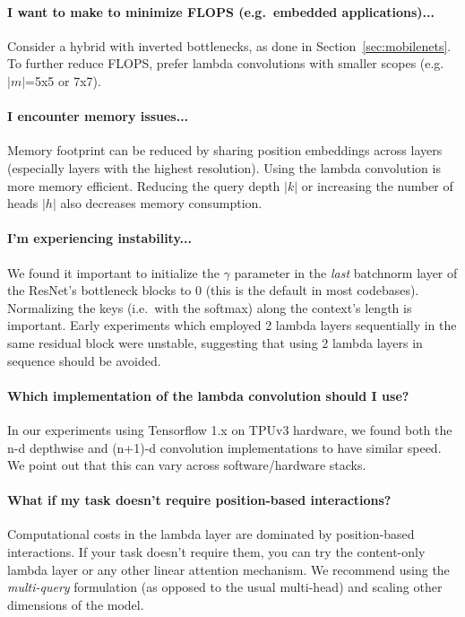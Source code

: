 \documentclass{article} \usepackage{iclr2021_conference,times}
\begin{document}
\paragraph{I want to make to minimize FLOPS (e.g.\ embedded applications)...}
Consider a hybrid with inverted bottlenecks, as done in Section~\ref{sec:mobilenets}.
To further reduce FLOPS, prefer lambda convolutions with smaller scopes (e.g. $|m|$=5x5 or 7x7).

\paragraph{I encounter memory issues...}
Memory footprint can be reduced by sharing position embeddings across layers (especially layers with the highest resolution).
Using the lambda convolution is more memory efficient.
Reducing the query depth $|k|$ or increasing the number of heads $|h|$ also decreases memory consumption.

\paragraph{I'm experiencing instability...}
We found it important to initialize the $\gamma$ parameter in the \emph{last} batchnorm layer of the ResNet's bottleneck blocks to 0 (this is the default in most codebases).
Normalizing the keys (i.e.\ with the softmax) along the context's length is important. 
Early experiments which employed 2 lambda layers sequentially in the same residual block were unstable, suggesting that using 2 lambda layers in sequence should be avoided.

\paragraph{Which implementation of the lambda convolution should I use?}
In our experiments using Tensorflow 1.x on TPUv3 hardware, we found both the n-d depthwise and (n+1)-d convolution implementations to have similar speed.
We point out that this can vary across software/hardware stacks.

\paragraph{What if my task doesn't require position-based interactions?}
Computational costs in the lambda layer are dominated by position-based interactions.
If your task doesn't require them, you can try the content-only lambda layer or any other linear attention mechanism.
We recommend using the \emph{multi-query} formulation (as opposed to the usual multi-head) and scaling other dimensions of the model. \newpage
\end{document}
